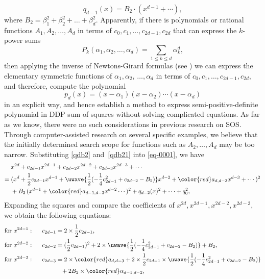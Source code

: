 \documentclass[runningheads]{llncs}
\begin{document}
\begin{equation}
q_{d-1}(x)=B_2\cdot \left(x^{d-1}+\cdots\right),
\label{qdb21}
\end{equation}
where $B_2=\beta_1^2+\beta_2^2+\ldots+\beta_d^2$. 
Apparently, if there is polynomials or rational functions $A_1,A_2,\ldots,A_d$ in terms of $c_{0},c_1,\ldots,c_{2d-1},c_{2d}$ that can express the $k$-power sums 
$$
P_k(\alpha_1,\alpha_2,\ldots,\alpha_d)=
\sum_{1\leq k\leq d}\alpha_{k}^d,
$$
then applying the inverse of Newtons-Girard formulas
(see \cite{Gathen2003})
we can express the elementary symmetric functions of  $\alpha_1,\alpha_2$, $\ldots,\alpha_d$ in terms of $c_0,c_1,\ldots,c_{2d-1},c_{2d}$,
and therefore, compute the
polynomial 
$$
p_d(x)=(x-\alpha_1)(x-\alpha_2)\cdots (x-\alpha_d)
$$
in an explicit way, and hence establish a method to express semi-positive-definite polynomial in DDP sum of squares without solving complicated equations.   
As far as we know, there were no such considerations in previous research on SOS. 
Through computer-assisted research on several specific examples, we believe that the initially determined search scope for functions such as \( A_2, \ldots, A_d \) may be too narrow. Substituting \eqref{qdb2} and~\eqref{qdb21} into \eqref{eq-0001},
we have
\begin{align*}
&\;x^{2d}+c_{2d-1}x^{2d-1}+c_{2d-2}x^{2d-2}+c_{2d-3}x^{2d-3}+\cdots\\
=&\;
(x^d+\frac{1}{2}c_{2d-1}x^{d-1}+
\uwave{\frac{1}{2}(-\frac{1}{4}c_{2d-1}^2+c_{2d-2}-B_2)}x^{d-2}+{\color{red}a_{d,d-3}}x^{d-3}+\cdots)^2
\\
&\;+ 
B_2\,(x^{d-1}+{\color{red}a_{d-1,d-2}}x^{d-2}\cdots)^2+q_{d-2}(x)^2+\cdots+q_0^2,
\end{align*}
Expanding the squares and compare the coefficients of $x^{2d}, x^{2d-1},x^{2d-2},x^{2d-3}$, we obtain the following equations:
\begin{align}
    \text{for } x^{2d-1}:\phantom{xx}&\;
    c_{2d-1}=2\times \frac{1}{2}c_{2d-1},
    \nonumber \\
    \text{for } x^{2d-2}:\phantom{xx}&\;
c_{2d-2}=(\frac{1}{2}c_{2d-1})^2+ 
2\times \uwave{\frac{1}{2}(-\frac{1}{4}c_{2d-1}^2+c_{2d-2}-B_2)}+B_2,
    \label{eq-x2d2}\\
    \text{for } x^{2d-3}:\phantom{xx}&\;
c_{2d-3}= 2\times {\color{red}a_{d,d-3}}+2\times \frac{1}{2}c_{2d-1}\times 
\uwave{\frac{1}{2}(-\frac{1}{4}c_{2d-1}^2+c_{2d-2}-B_2)}   
    \nonumber \\
    &\phantom{xxxxxx}+2B_2\times {\color{red}\alpha_{d-1,d-2}},
    \label{eq-x2d3}
\end{align}
\end{document}
